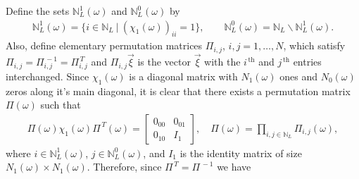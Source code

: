\documentclass{cmslatex}
\begin{document}
Define the sets $\mathbb{N}_L^1(\omega)$ and $\mathbb{N}_L^0(\omega)$ by
%
\begin{align}\label{eq:Zero_One_indices}
  \mathbb{N}_L^1(\omega)=\{i\in\mathbb{N}_L \ | \ (\chi_1(\omega))_{ii}=1\}, \qquad
  \mathbb{N}_L^0(\omega)=\mathbb{N}_L\backslash \mathbb{N}_L^1(\omega).
\end{align}
%
Also, define elementary permutation matrices \cite{Demmel:1997} $\Pi_{i,j}$,
$i,j=1,\ldots,N$, which satisfy $\Pi_{i,j}=\Pi_{i,j}^{\,-1}=\Pi_{i,j}^{\,T}$ and
$\Pi_{i,j}\vec{\xi}$ is the vector $\vec{\xi}$ with the $i^{\,\text{th}}$
and $j^{\,\text{th}}$ entries interchanged. Since $\chi_1(\omega)$ is a
diagonal matrix with $N_1(\omega)$ ones and $N_0(\omega)$ zeros along it's main
diagonal, it is clear that there exists a permutation matrix $\Pi(\omega)$
such that
%
\begin{align}\label{eq:chi_Perm}
  \Pi(\omega)\chi_1(\omega)\Pi^{\,T}(\omega)=
  \left[
  \begin{array}{ccc}
    0_{00}&0_{01}\\
    0_{10}&I_1   
    \end{array}
\right],
\quad
\Pi(\omega)=\prod_{i,j\in\mathbb{N}_L}\Pi_{i,j}(\omega),
\end{align}
%
where $i\in\mathbb{N}_L^1(\omega)$, $j\in\mathbb{N}_L^0(\omega)$,
and $I_1$ is the identity matrix of size $N_1(\omega)\times N_1(\omega)$. Therefore,
since  $\Pi^{\,T}=\Pi^{\,-1}$ we have
%
\end{document}
